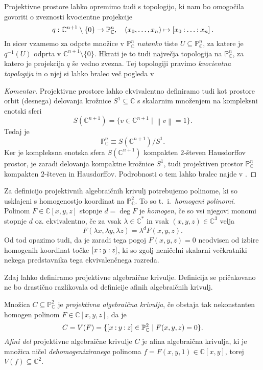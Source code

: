\documentclass[mat1]{fmfdelo}
\numberwithin{equation}{section}
\newcommand{\C}{\mathbb C}
\newcommand{\PP}{\mathbb P}
\newcommand{\CM}{\mathbb C ^*}
\newcommand{\PC}{\mathbb{P}^2_\C}
\newcommand{\inv}{^{-1}}
\newcommand{\pcoor}[1]{%
\begingroup\lccode`~=`: \lowercase{\endgroup
\edef~}{\mathbin{\mathchar\the\mathcode`:}\nobreak}%
\left[%
\begingroup
\mathcode`:=\string"8000
#1%
\endgroup
\right]%
}
\theoremstyle{definition}
\newenvironment{komentar}[1][Komentar]{\begin{proof}[#1]\let\qed\relax}{\end{proof}}
\begin{document}
\begin{opomba} 
    \label{topologija na projektivnih prostorih}   
    Projektivne prostore lahko opremimo tudi s topologijo, ki nam bo omogočila govoriti o zveznosti kvocientne projekcije
    \[
        q : \C^{n+1}\setminus\{0\} \to \PP_\C^n, \quad (x_0, \ldots, x_n) \mapsto \pcoor{x_0 : \ldots : x_n}. 
    \]
    In sicer vzamemo za odprte množice v $\PP_\C^n$ \emph{natanko} tiste $U \subseteq \PP_\C^n$, za katere je $q\inv(U)$ odprta v $\C^{n+1}\setminus\{0\}$. Hkrati je to tudi največja topologija na $\PP_\C^n$, za katero je projekcija $q$ še vedno zvezna.  
    Tej topologiji pravimo \emph{kvocientna topologija} in o njej si lahko bralec več pogleda v \cite[poglavje 3.2.]{MrcunTop}
\end{opomba}

\begin{komentar}
    Projektivne prostore lahko ekvivalentno definiramo tudi kot prostore orbit (desnega) delovanja krožnice $S^1 \subseteq \C$ s skalarnim množenjem na kompleksni enotski sferi 
    \[
        S(\C^{n+1}) = \{v \in \C^{n+1} \mid \left\lVert v\right\rVert = 1\}.
    \]
    Tedaj je
    \[
        \PP_\C^n \equiv S(\C^{n+1})/S^1.
    \]
    Ker je kompleksna enotska sfera $S(\C^{n+1})$ kompakten $2$-števen Hausdorffov prostor, je zaradi delovanja kompaktne krožnice $S^1$, tudi projektiven prostor $\PP_\C^n$ kompakten $2$-števen in Hausdorffov. Podrobnosti o tem lahko bralec najde v 
    \cite[Zgled 3.43. (2)]{MrcunTop}.
\end{komentar}

Za definicijo projektivnih algebraičnih krivulj potrebujemo  polinome, ki so usklajeni s homogenostjo koordinat na $\PC$. To so t.~i.\ \emph{homogeni polinomi}. Polinom $F \in \C[x,y,z]$ stopnje $d = \deg F$ je \emph{homogen}, če so vsi njegovi monomi stopnje $d$ oz. ekvivalentno, če za vsak $\lambda \in \CM$ in vsak $(x,y,z) \in \C^3$ velja
\[
    F(\lambda x, \lambda y, \lambda z) = \lambda^d F(x,y,z). 
\]
Od tod opazimo tudi, da je zaradi tega pogoj $F(x,y,z) = 0$ neodvisen od izbire homogenih koordinat točke $\pcoor{x : y : z}$, ki so zgolj neničelni skalarni večkratniki nekega predstavnika tega ekvivalenčnega razreda.  

Zdaj lahko definiramo projektivne algebraične krivulje. Definicija se pričakovano ne bo drastično razlikovala od definicije afinih algebraičnih krivulj.

\begin{definicija}
    Množica $C \subseteq \PC$ je \emph{projektivna algebraična krivulja}, če obstaja tak nekonstanten homogen polinom $F \in \C[x,y,z]$, da je
    \[
        C = V(F) = \{\pcoor{x: y: z} \in \PC \mid F(x,y,z) = 0\}. 
    \]
    \emph{Afini del} projektivne algebraične krivulje $C$ je afina algebraična krivulja, ki je množica ničel \emph{dehomogeniziranega} polinoma $f = F(x,y,1) \in \C[x,y]$, torej $V(f) \subseteq \C^2$. 
\end{definicija}
\end{document}
